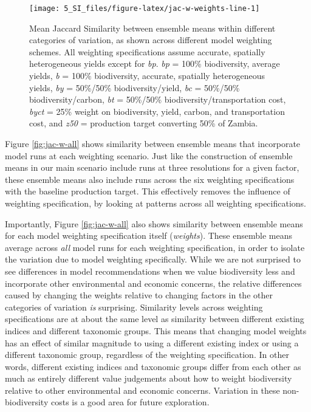 \documentclass[
]{article}
\begin{document}
\begin{figure}
\texttt{[image: 5\_SI\_files/figure-latex/jac-w-weights-line-1]} \caption{Mean Jaccard Similarity between ensemble means within different categories of variation, as shown across different model weighting schemes. All weighting specifications assume accurate, spatially heterogeneous yields except for \emph{bp}. \emph{bp} = 100\% biodiversity, average yields, \emph{b} = 100\% biodiversity, accurate, spatially heterogeneous yields, \emph{by} = 50\%/50\% biodiversity/yield, \emph{bc} = 50\%/50\% biodiversity/carbon, \emph{bt} = 50\%/50\% biodiversity/transportation cost, \emph{byct} = 25\% weight on biodiversity, yield, carbon, and transportation cost, and \emph{z50} = production target converting 50\% of Zambia.}\label{fig:jac-w-weights-line}
\end{figure}

Figure \ref{fig:jac-w-all} shows similarity between ensemble means that incorporate model runs at each weighting scenario. Just like the construction of ensemble means in our main scenario include runs at three resolutions for a given factor, these ensemble means also include runs across the six weighting specifications with the baseline production target. This effectively removes the influence of weighting specification, by looking at patterns across all weighting specifications.

Importantly, Figure \ref{fig:jac-w-all} also shows similarity between ensemble means for each model weighting specification itself (\emph{weights}). These ensemble means average across \emph{all} model runs for each weighting specification, in order to isolate the variation due to model weighting specifically. While we are not surprised to see differences in model recommendations when we value biodiversity less and incorporate other environmental and economic concerns, the relative differences caused by changing the weights relative to changing factors in the other categories of variation \emph{is} surprising. Similarity levels across weighting specifications are at about the same level as similarity between different existing indices and different taxonomic groups. This means that changing model weights has an effect of similar magnitude to using a different existing index or using a different taxonomic group, regardless of the weighting specification. In other words, different existing indices and taxonomic groups differ from each other as much as entirely different value judgements about how to weight biodiversity relative to other environmental and economic concerns. Variation in these non-biodiversity costs is a good area for future exploration.
\end{document}
